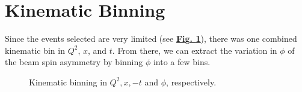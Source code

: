 \documentclass[10pt,prd,aps,showpacs,twocolumn,unsortedaddress]{revtex4-1}
\renewcommand\b[1]{{\textbf{#1}}}
\renewcommand\u[1]{{\underline{#1}}}
\newcommand\Fig[1]{\b{{\u{{Fig. #1}}}}}
\begin{document}
\section{Kinematic Binning}
Since the events selected are very limited (see \Fig{\ref{fig:kin_binning}}), there was one combined kinematic bin in $Q^2$, $x$, and $t$. From there, we can extract the variation in $\phi$ of the beam spin asymmetry by binning $\phi$ into a few bins.  
\begin{widetext}
\begin{figure}
\caption{Kinematic binning in $Q^2, x, -t$ and $\phi$, respectively.}
\label{fig:kin_binning}
\end{figure}
\end{widetext}
\end{document}

